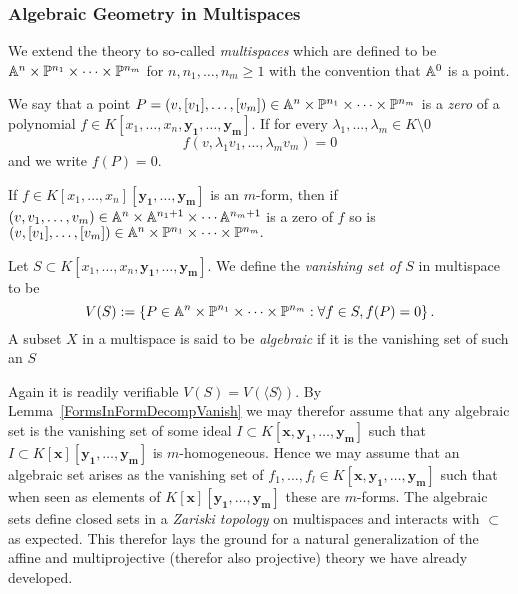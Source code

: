     \subsubsection{Algebraic Geometry in Multispaces}
        We extend the theory to so-called \textit{multispaces} which are defined to be $\mathbb{A}^n\times \mathbb{P}^{n_1}\times \cdots \times \mathbb{P}^{n_m}$ for $n,n_1,\dots,n_m \geq 1$ with the convention that $\mathbb{A}^0$ is a point.
        \begin{definition}
            We say that a point $P=(v,[v_1],\dots,[v_m])\in \mathbb{A}^n\times \mathbb{P}^{n_1}\times \cdots \times \mathbb{P}^{n_m}$ is a \textit{zero} of a polynomial $f\in K[x_1,\dots,x_n,\mathbf{y_1},\dots,\mathbf{y_m}]$. If for every $\lambda_1,\dots,\lambda_m\in K\setminus 0$ 
            $$f(v,\lambda_1v_1,\dots,\lambda_mv_m)=0$$
            and we write $f(P)=0$.
        \end{definition}
        \begin{remark}
            If $f\in K[x_1,\dots,x_n][\mathbf{y_1},\dots,\mathbf{y_m}]$ is an $m$-form, then if $(v,v_1,\dots,v_m)\in \mathbb{A}^n\times \mathbb{A}^{n_1+1}\times \cdots \mathbb{A}^{n_m+1}$ is a zero of $f$ so is $(v,[v_1],\dots,[v_m])\in \mathbb{A}^n\times \mathbb{P}^{n_1}\times \cdots \times \mathbb{P}^{n_m}.$
        \end{remark}
        \begin{definition}
            Let $S\subset K[x_1,\dots,x_n,\mathbf{y_1},\dots,\mathbf{y_m}]$. We define the \textit{vanishing set of $S$} in multispace to be 
            $$V(S):=\left\{ P\in \mathbb{A}^n\times \mathbb{P}^{n_1}\times \cdots\times \mathbb{P}^{n_m}: \forall f\in S, f(P)=0\right\}.$$
            A subset $X$ in a multispace is said to be \textit{algebraic} if it is the vanishing set of such an $S$
        \end{definition}
        \begin{remark}
            Again it is readily verifiable $V(S)=V(\langle S\rangle)$. By Lemma~\ref{FormsInFormDecompVanish} we may therefor assume that any algebraic set is the vanishing set of some ideal $I\subset K[\mathbf{x},\mathbf{y_1},\dots,\mathbf{y_m}]$ such that $I\subset K[\mathbf{x}][\mathbf{y_1},\dots,\mathbf{y_m}]$ is $m$-homogeneous. Hence we may assume that an algebraic set arises as the vanishing set of $f_1,\dots,f_l\in K[\mathbf{x},\mathbf{y_1},\dots,\mathbf{y_m}]$ such that when seen as elements of $K[\mathbf{x}][\mathbf{y_1},\dots,\mathbf{y_m}]$ these are $m$-forms. The algebraic sets define closed sets in a \textit{Zariski topology} on multispaces and interacts with $\subset$ as expected. This therefor lays the ground for a natural generalization of the affine and multiprojective (therefor also projective) theory we have already developed.  
        \end{remark}
